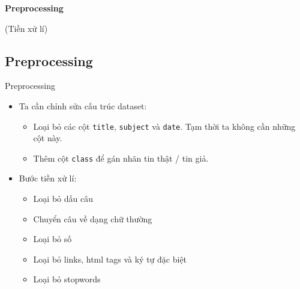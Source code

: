 \documentclass[aspectratio=169,xcolor=dvipsnames]{beamer}
\begin{document}
\begin{frame}
	\Huge{\centerline{\textbf{Preprocessing}}}
	\centerline{(Tiền xử lí)}
\end{frame}

\subsection{Preprocessing}
\begin{frame}{Preprocessing}
\begin{itemize}
\item Ta cần chỉnh sửa cấu trúc dataset:
\begin{itemize}
\item Loại bỏ các cột \texttt{title}, \texttt{subject} và \texttt{date}. Tạm thời ta không cần những cột này.
\item Thêm cột \texttt{class} để gán nhãn tin thật / tin giả.
\end{itemize}
\item Bước tiền xử lí:
\begin{itemize}
\item Loại bỏ dấu câu
\item Chuyển câu về dạng chữ thường
\item Loại bỏ số
\item Loại bỏ links, html tags và ký tự đặc biệt
\item Loại bỏ stopwords
\end{itemize}
\end{itemize}
\end{frame}
\end{document}
